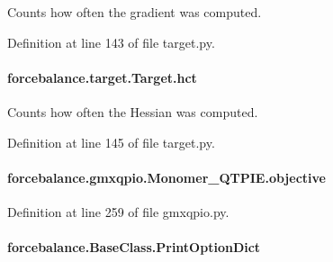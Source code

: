 Counts how often the gradient was computed. 



Definition at line 143 of file target.\-py.

\hypertarget{classforcebalance_1_1target_1_1Target_a5b5a42f78052b47f29ed4b940c6111a1}{
\paragraph[{hct}]{\setlength{\rightskip}{0pt plus 5cm}forcebalance.\-target.\-Target.\-hct\hspace{0.3cm}{\ttfamily [inherited]}}}\label{classforcebalance_1_1target_1_1Target_a5b5a42f78052b47f29ed4b940c6111a1}


Counts how often the Hessian was computed. 



Definition at line 145 of file target.\-py.

\hypertarget{classforcebalance_1_1gmxqpio_1_1Monomer__QTPIE_a0ae55c79486f2f6e3f7bc0bb7f4f387c}{
\paragraph[{objective}]{\setlength{\rightskip}{0pt plus 5cm}forcebalance.\-gmxqpio.\-Monomer\-\_\-\-Q\-T\-P\-I\-E.\-objective}}\label{classforcebalance_1_1gmxqpio_1_1Monomer__QTPIE_a0ae55c79486f2f6e3f7bc0bb7f4f387c}


Definition at line 259 of file gmxqpio.\-py.

\hypertarget{classforcebalance_1_1BaseClass_afc6659278497d7245bc492ecf405ccae}{
\paragraph[{Print\-Option\-Dict}]{\setlength{\rightskip}{0pt plus 5cm}forcebalance.\-Base\-Class.\-Print\-Option\-Dict\hspace{0.3cm}{\ttfamily [inherited]}}}\label{classforcebalance_1_1BaseClass_afc6659278497d7245bc492ecf405ccae}


